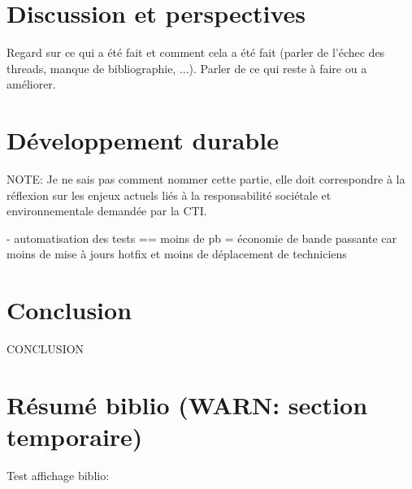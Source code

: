 \documentclass[a4paper]{article}
\begin{document}
\clearpage

\section{Discussion et perspectives}

Regard sur ce qui a été fait et comment cela a été fait (parler de l'échec
des threads, manque de bibliographie, ...). Parler de ce qui reste à faire ou a
améliorer.

\clearpage

\section{Développement durable}

NOTE: Je ne sais pas comment nommer cette partie, elle doit correspondre à la
réflexion sur les enjeux actuels liés à la responsabilité sociétale et
environnementale demandée par la CTI.

- automatisation des tests == moins de pb = économie de bande passante car moins
  de mise à jours hotfix et moins de déplacement de techniciens

\clearpage

\section*{Conclusion}

CONCLUSION



\section{Résumé biblio (WARN: section temporaire)}

Test affichage biblio:
\end{document}
